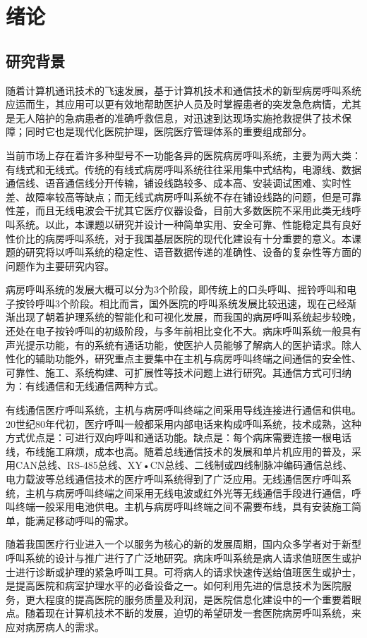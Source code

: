 
\chapter{绪论}
\section{研究背景}
随着计算机通讯技术的飞速发展，基于计算机技术和通信技术的新型病房呼叫系统应运而生，其应用可以更有效地帮助医护人员及时掌握患者的突发急危病情，尤其是无人陪护的急病患者的准确呼救信息，对迅速到达现场实施抢救提供了技术保障；同时它也是现代化医院护理，医院医疗管理体系的重要组成部分。

当前市场上存在着许多种型号不一功能各异的医院病房呼叫系统，主要为两大类：有线式和无线式。传统的有线式病房呼叫系统往往采用集中式结构，电源线、数据通信线、语音通信线分开传输，铺设线路较多、成本高、安装调试困难、实时性差、故障率较高等缺点；而无线式病房呼叫系统不存在铺设线路的问题，但是可靠性差，而且无线电波会干扰其它医疗仪器设备，目前大多数医院不采用此类无线呼叫系统。以此，本课题以研究并设计一种简单实用、安全可靠、性能稳定具有良好性价比的病房呼叫系统，对于我国基层医院的现代化建设有十分重要的意义。本课题的研究将以呼叫系统的稳定性、语音数据传递的准确性、设备的复杂性等方面的问题作为主要研究内容。

病房呼叫系统的发展大概可以分为3个阶段，即传统上的口头呼叫、摇铃呼叫和电子按铃呼叫3个阶段。相比而言，国外医院的呼叫系统发展比较迅速，现在己经渐渐出现了朝着护理系统的智能化和可视化发展，而我国的病房呼叫系统起步较晚，还处在电子按铃呼叫的初级阶段，与多年前相比变化不大。病床呼叫系统一般具有声光提示功能，有的系统有通话功能，使医护人员能够了解病人的医护请求。除人性化的辅助功能外，研究重点主要集中在主机与病房呼叫终端之间通信的安全性、可靠性、施工、系统构建、可扩展性等技术问题上进行研究。其通信方式可归纳为：有线通信和无线通信两种方式。

有线通信医疗呼叫系统，主机与病房呼叫终端之间采用导线连接进行通信和供电。20世纪80年代初，医疗呼叫一般都采用内部电话来构成呼叫系统，技术成熟，这种方式优点是：可进行双向呼叫和通话功能。缺点是：每个病床需要连接一根电话线，布线施工麻烦，成本也高。随着总线通信技术的发展和单片机应用的普及，采用CAN总线、RS-485总线、XY•CN总线、二线制或四线制脉冲编码通信总线、电力载波等总线通信技术的医疗呼叫系统得到了广泛应用。无线通信医疗呼叫系统，主机与病房呼叫终端之间采用无线电波或红外光等无线通信手段进行通信，呼叫终端一般采用电池供电。主机与病房呼叫终端之间不需要布线，具有安装施工简单，能满足移动呼叫的需求。 

随着我国医疗行业进入一个以服务为核心的新的发展周期，国内众多学者对于新型呼叫系统的设计与推广进行了广泛地研究。病床呼叫系统是病人请求值班医生或护士进行诊断或护理的紧急呼叫工具。可将病人的请求快速传送给值班医生或护士，是提高医院和病室护理水平的必备设备之一。如何利用先进的信息技术为医院服务，更大程度的提高医院的服务质量及利润，是医院信息化建设中的一个重要着眼点。随着现在计算机技术不断的发展，迫切的希望研发一套医院病房呼叫系统，来应对病房病人的需求。

